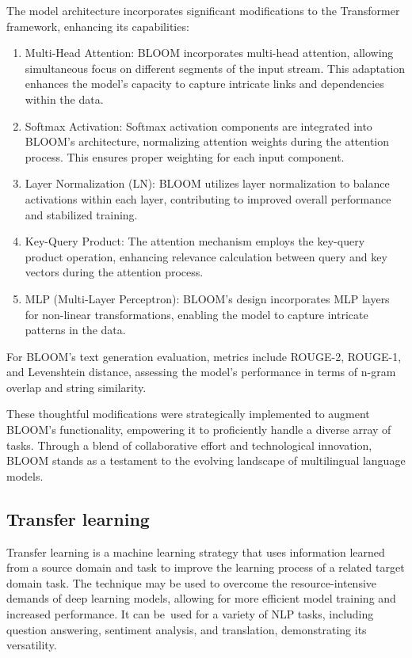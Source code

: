 The model architecture incorporates significant modifications to the Transformer framework, enhancing its capabilities:

\begin{enumerate}
    \item Multi-Head Attention: BLOOM incorporates multi-head attention, allowing simultaneous focus on different segments of the input stream. This adaptation enhances the model's capacity to capture intricate links and dependencies within the data.
    \item Softmax Activation: Softmax activation components are integrated into BLOOM's architecture, normalizing attention weights during the attention process. This ensures proper weighting for each input component.
    \item Layer Normalization (LN): BLOOM utilizes layer normalization to balance activations within each layer, contributing to improved overall performance and stabilized training.
    \item Key-Query Product: The attention mechanism employs the key-query product operation, enhancing relevance calculation between query and key vectors during the attention process.
    \item MLP (Multi-Layer Perceptron): BLOOM's design incorporates MLP layers for non-linear transformations, enabling the model to capture intricate patterns in the data.
    
\end{enumerate}

For BLOOM's text generation evaluation, metrics include ROUGE-2, ROUGE-1, and Levenshtein distance, assessing the model's performance in terms of n-gram overlap and string similarity.

These thoughtful modifications were strategically implemented to augment BLOOM's functionality, empowering it to proficiently handle a diverse array of tasks. Through a blend of collaborative effort and technological innovation, BLOOM stands as a testament to the evolving landscape of multilingual language models.

\subsection{Transfer learning}
Transfer learning is a machine learning strategy that uses information learned from a source domain and task to improve the learning process of a related target domain task. The technique may be used to overcome the resource-intensive demands of deep learning models, allowing for more efficient model training and increased performance. It can be used for a variety of NLP tasks, including question answering, sentiment analysis, and translation, demonstrating its versatility.\cite{alyafeai2020survey}

